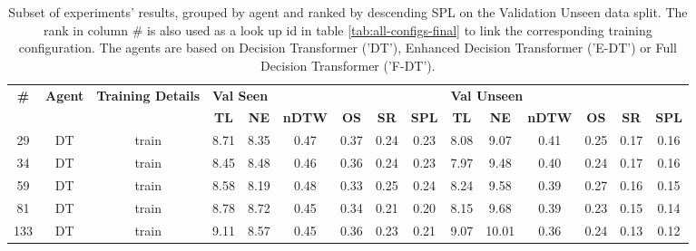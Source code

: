 \begin{table}
\centering
\caption{\label{tab:layers}Subset of experiments' results, grouped by agent and ranked by descending SPL on the Validation Unseen data split. The rank in column \# is also used as a look up id in table \ref{tab:all-configs-final} to link the corresponding training configuration.     \newline The agents are based on Decision Transformer ('DT'), Enhanced Decision Transformer ('E-DT') or Full Decision Transformer ('F-DT').}
\begin{tabular}{@{\hskip3pt}c@{\hskip3pt}c@{\hskip3pt}c@{\hskip3pt}c@{\hskip3pt}c@{\hskip3pt}c@{\hskip3pt}c@{\hskip3pt}c@{\hskip3pt}c@{\hskip3pt}c@{\hskip3pt}c@{\hskip3pt}c@{\hskip3pt}c@{\hskip3pt}c@{\hskip3pt}c}
\toprule
\textbf{\#} & \textbf{Agent} & \textbf{Training Details} & \multicolumn{6}{l}{\textbf{Val Seen}} & \multicolumn{6}{l}{\textbf{Val Unseen}} \\
 \textbf{~} &     \textbf{~} &                \textbf{~} &       \textbf{TL} & \textbf{NE} & \textbf{nDTW} & \textbf{OS} & \textbf{SR} & \textbf{SPL} &         \textbf{TL} & \textbf{NE} & \textbf{nDTW} & \textbf{OS} & \textbf{SR} & \textbf{SPL} \\
\midrule
         29 &             DT &                     train &              8.71 &        8.35 &          0.47 &        0.37 &        0.24 &         0.23 &                8.08 &        9.07 &          0.41 &        0.25 &        0.17 &         0.16 \\
         34 &             DT &                     train &              8.45 &        8.48 &          0.46 &        0.36 &        0.24 &         0.23 &                7.97 &        9.48 &          0.40 &        0.24 &        0.17 &         0.16 \\
         59 &             DT &                     train &              8.58 &        8.19 &          0.48 &        0.33 &        0.25 &         0.24 &                8.24 &        9.58 &          0.39 &        0.27 &        0.16 &         0.15 \\
         81 &             DT &                     train &              8.78 &        8.72 &          0.45 &        0.34 &        0.21 &         0.20 &                8.15 &        9.68 &          0.39 &        0.23 &        0.15 &         0.14 \\
        133 &             DT &                     train &              9.11 &        8.57 &          0.45 &        0.36 &        0.23 &         0.21 &                9.07 &       10.01 &          0.36 &        0.24 &        0.13 &         0.12 \\

\end{tabular}
\end{table}
